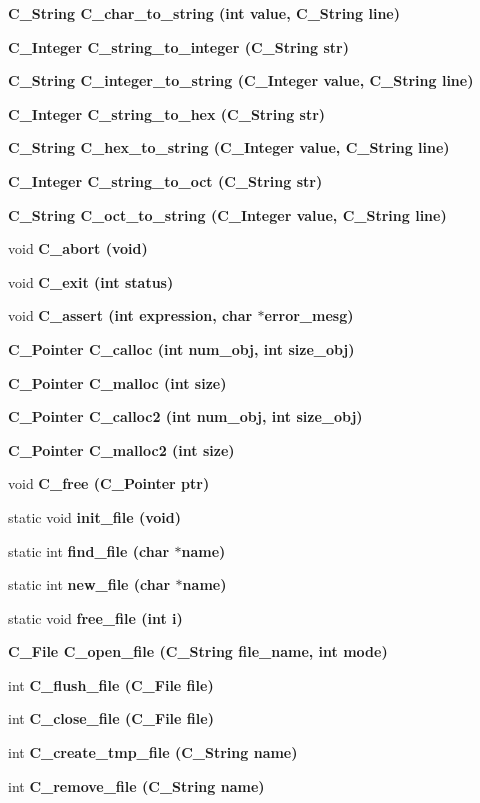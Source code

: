 \begin{CompactItemize}
\item 
\bf{C\_\-String} \bf{C\_\-char\_\-to\_\-string} (int value, \bf{C\_\-String} line)
\item 
\bf{C\_\-Integer} \bf{C\_\-string\_\-to\_\-integer} (\bf{C\_\-String} str)
\item 
\bf{C\_\-String} \bf{C\_\-integer\_\-to\_\-string} (\bf{C\_\-Integer} value, \bf{C\_\-String} line)
\item 
\bf{C\_\-Integer} \bf{C\_\-string\_\-to\_\-hex} (\bf{C\_\-String} str)
\item 
\bf{C\_\-String} \bf{C\_\-hex\_\-to\_\-string} (\bf{C\_\-Integer} value, \bf{C\_\-String} line)
\item 
\bf{C\_\-Integer} \bf{C\_\-string\_\-to\_\-oct} (\bf{C\_\-String} str)
\item 
\bf{C\_\-String} \bf{C\_\-oct\_\-to\_\-string} (\bf{C\_\-Integer} value, \bf{C\_\-String} line)
\item 
void \bf{C\_\-abort} (void)
\item 
void \bf{C\_\-exit} (int status)
\item 
void \bf{C\_\-assert} (int expression, char $\ast$error\_\-mesg)
\item 
\bf{C\_\-Pointer} \bf{C\_\-calloc} (int num\_\-obj, int size\_\-obj)
\item 
\bf{C\_\-Pointer} \bf{C\_\-malloc} (int size)
\item 
\bf{C\_\-Pointer} \bf{C\_\-calloc2} (int num\_\-obj, int size\_\-obj)
\item 
\bf{C\_\-Pointer} \bf{C\_\-malloc2} (int size)
\item 
void \bf{C\_\-free} (\bf{C\_\-Pointer} ptr)
\item 
static void \bf{init\_\-file} (void)
\item 
static int \bf{find\_\-file} (char $\ast$\bf{name})
\item 
static int \bf{new\_\-file} (char $\ast$\bf{name})
\item 
static void \bf{free\_\-file} (int i)
\item 
\bf{C\_\-File} \bf{C\_\-open\_\-file} (\bf{C\_\-String} file\_\-name, int \bf{mode})
\item 
int \bf{C\_\-flush\_\-file} (\bf{C\_\-File} \bf{file})
\item 
int \bf{C\_\-close\_\-file} (\bf{C\_\-File} \bf{file})
\item 
int \bf{C\_\-create\_\-tmp\_\-file} (\bf{C\_\-String} \bf{name})
\item 
int \bf{C\_\-remove\_\-file} (\bf{C\_\-String} \bf{name})

\end{CompactItemize}
